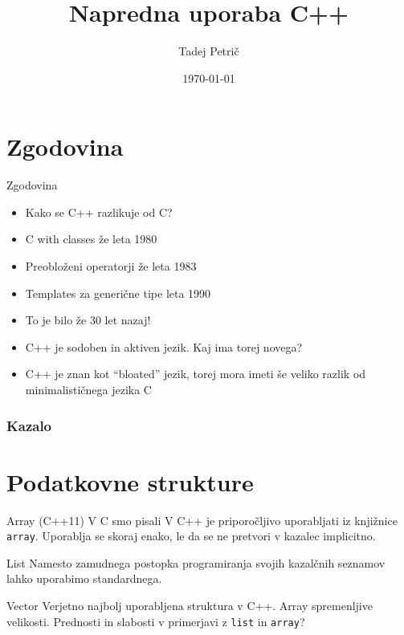 \documentclass{beamer}
\title{Napredna uporaba C++}
\author{Tadej Petrič}
\date{\today}
\begin{document}
\begin{frame}[plain]
  \titlepage{}
\end{frame}

\section{Zgodovina}
\begin{frame}[plain]{Zgodovina}
  \begin{itemize}
\item<1-> Kako se C++ razlikuje od C?
\item<2-> C with classes že leta 1980
\item<2-> Preobloženi operatorji že leta 1983
\item<2-> Templates za generične tipe leta 1990
\item<3-> To je bilo že 30 let nazaj!
\item<3-> C++ je sodoben in aktiven jezik. Kaj ima torej novega?
\item<3-> C++ je znan kot ``bloated'' jezik, torej mora imeti še veliko razlik od minimalističnega jezika C
  \end{itemize}
\end{frame}

\begin{frame}[plain]
  \frametitle{Kazalo}
  \tableofcontents
\end{frame}

\section{Podatkovne strukture}
\begin{frame}{Array (C++11)}
  V C smo pisali
  V C++ je priporočljivo uporabljati
  iz knjižnice \texttt{array}.
  Uporablja se skoraj enako, le da se ne pretvori v kazalec implicitno.
\end{frame}

\begin{frame}{List}
  Namesto zamudnega postopka programiranja svojih kazalčnih seznamov lahko uporabimo standardnega.
\end{frame}

\begin{frame}{Vector}
  Verjetno najbolj uporabljena struktura v C++. Array spremenljive velikosti.
  Prednosti in slabosti v primerjavi z \texttt{list} in \texttt{array}?
\end{frame}
\end{document}
